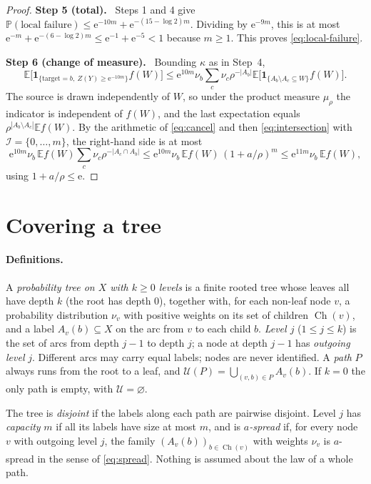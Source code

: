 \documentclass[11pt]{article}
\numberwithin{equation}{section}
\newcommand{\PP}{\mathbb P}
\newcommand{\EE}{\mathbb E}
\newcommand{\ind}{\mathbf 1}
\newcommand{\UU}{\mathcal U}
\newcommand{\ch}{\operatorname{Ch}}
\newcommand{\ee}{\mathrm e}
\newcommand{\step}[1]{\par\smallskip\noindent\textbf{Step #1.}\ }
\begin{document}
\begin{proof}
\step{5 (total)} Steps 1 and 4 give
$\PP(\text{local failure})\le\ee^{-10m}+\ee^{-(15-\log2)m}$. Dividing by
$\ee^{-9m}$, this is at most $\ee^{-m}+\ee^{-(6-\log2)m}\le
\ee^{-1}+\ee^{-5}<1$ because $m\ge1$. This proves
\eqref{eq:local-failure}.

\step{6 (change of measure)} Bounding $\kappa$ as in Step~4,
\[
 \EE\bigl[\ind_{\{\mathrm{target}=b,\ Z(Y)\ge\ee^{-10m}\}}f(W)\bigr]
 \le\ee^{10m}\nu_b\sum_c\nu_c\rho^{-|A_b|}
   \EE\bigl[\ind_{\{A_b\setminus A_c\subseteq W\}}f(W)\bigr].
\]
The source is drawn independently of $W$, so under the product measure
$\mu_\rho$ the indicator is independent of $f(W)$, and the last
expectation equals
$\rho^{|A_b\setminus A_c|}\EE f(W)$. By the arithmetic of
\eqref{eq:cancel} and then \eqref{eq:intersection} with
$\mathcal I=\{0,\ldots,m\}$, the right-hand side is at most
\[
 \ee^{10m}\nu_b\,\EE f(W)\sum_c\nu_c\rho^{-|A_c\cap A_b|}
 \le\ee^{10m}\nu_b\,\EE f(W)\,(1+a/\rho)^m
 \le\ee^{11m}\nu_b\,\EE f(W),
\]
using $1+a/\rho\le\ee$.
\end{proof}

\section{Covering a tree}\label{sec:trees}

\paragraph{Definitions.}
A \emph{probability tree on $X$ with $k\ge0$ levels} is a finite rooted
tree whose leaves all have depth $k$ (the root has depth $0$), together
with, for each non-leaf node $v$, a probability distribution $\nu_v$ with
positive weights on its set of children $\ch(v)$, and a label
$A_v(b)\subseteq X$ on the arc from $v$ to each child $b$. \emph{Level
$j$} ($1\le j\le k$) is the set of arcs from depth $j-1$ to depth $j$; a
node at depth $j-1$ has \emph{outgoing level} $j$. Different arcs may
carry equal labels; nodes are never identified. A \emph{path} $P$ always
runs from the root to a leaf, and
$\UU(P)=\bigcup_{(v,b)\in P}A_v(b)$. If $k=0$ the only path is empty, with
$\UU=\varnothing$.

The tree is \emph{disjoint} if the labels along each path are pairwise
disjoint. Level $j$ has \emph{capacity} $m$ if all its labels have size at
most $m$, and is \emph{$a$-spread} if, for every node $v$ with outgoing
level $j$, the family $(A_v(b))_{b\in\ch(v)}$ with weights $\nu_v$ is
$a$-spread in the sense of \eqref{eq:spread}. Nothing is assumed about the
law of a whole path.
\end{document}
